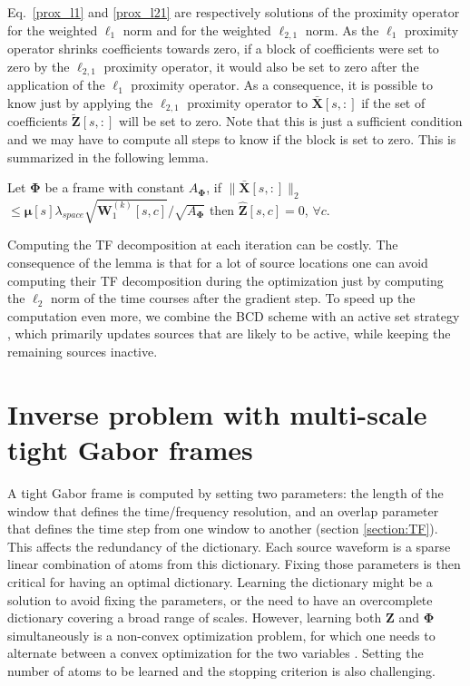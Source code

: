Eq.~\eqref{prox_l1} and \eqref{prox_l21} are respectively solutions of the proximity operator for the weighted $\ell_1$ norm and for the weighted $\ell_{2,1}$ norm. As the $\ell_1$ proximity operator shrinks coefficients towards zero, if a block of coefficients were set to zero by the $\ell_{2,1}$ proximity operator, it would also be set to zero after the application of the $\ell_1$ proximity operator. As a consequence, it is possible to know just by applying the $\ell_{2,1}$ proximity operator to $\bar{\mathbf{X}}[s,:]$ if the set of coefficients $\tilde{\mathbf{Z}}[s,:]$ will be set to zero. Note that this is just a sufficient condition and we may have to compute all steps to know if the block is set to zero. This is summarized in the following lemma.

\begin{lemma}
    Let $\mathbf{\Phi}$ be a frame with constant $A_{\mathbf{\Phi}}$, if $\|\bar{\mathbf{X}}[s,:]\|_2$ $\leq \mathbf{\mu}[s]\lambda_{space}\sqrt{\mathbf{W}_1^{(k)}[s,c]} / \sqrt{A_{\mathbf{\Phi}}}$ then $\hat{\mathbf{Z}}[s,c] = 0$, $\forall c$.
\end{lemma}

Computing the TF decomposition at each iteration can be costly. The consequence of the lemma is that for a lot of source locations one can avoid computing their TF decomposition during the optimization just by computing the $\ell_{2}$ norm of the time courses after the gradient step.
To speed up the computation even more, we combine the BCD scheme with an active set strategy \cite{friedman2010regularization}, which primarily updates sources that are likely to be active, while keeping the remaining sources inactive.

\section{Inverse problem with multi-scale tight Gabor frames}

A tight Gabor frame is computed by setting two parameters: the length of the window that defines the time/frequency resolution, and an overlap parameter that defines the time step from one window to another (section \ref{section:TF}). This affects the redundancy of the dictionary.
Each source waveform is a sparse linear combination of atoms from this dictionary. Fixing those parameters is then critical for having an optimal dictionary. %
Learning the dictionary might be a solution to avoid fixing the parameters, or the need to have an overcomplete dictionary covering a broad range of scales. However, learning both $\mathbf{Z}$ and $\mathbf{\Phi}$ simultaneously is a non-convex optimization problem, for which one needs to alternate between a convex optimization for the two variables \cite{montoya2014regularized}. Setting the number of atoms to be learned and the stopping criterion is also challenging.

